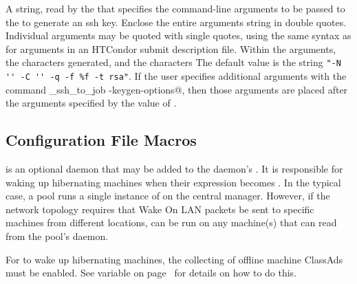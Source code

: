 \begin{description}
\label{param:SSHToJobSSHKeygenArgs}
\item[\Macro{SSH\_TO\_JOB\_SSH\_KEYGEN\_ARGS}]
  A string, read by the  that specifies 
  the command-line arguments to be passed to the 
  to generate an ssh key.
  Enclose the entire arguments string in double quotes.
  Individual arguments may be quoted with single quotes, using the same
  syntax as for arguments in an HTCondor submit description file.
  Within the arguments, 
  the characters \verb@%f@ are replaced by the path to the key file to be
  generated,
  and the characters \verb@%%@ are replaced by a single percent character.
  The default value is the string
  \verb|"-N '' -C '' -q -f %f -t rsa"|.
  If the user specifies additional
  arguments with the command
  \verb@condor_ssh_to_job -keygen-options@,
  then those arguments are placed after the arguments specified by
  the value of .

\end{description}

\subsection{\label{sec:Config-rooster} Configuration File Macros}

 is an optional daemon that may be added to the
 daemon's .
It is responsible for waking up
hibernating machines when their  expression becomes
.
In the typical case, a pool runs a single instance of
 on the central manager.
However, if the network topology requires that 
Wake On LAN packets be sent to specific machines from different locations,
 can be run on any
machine(s) that can read from the pool's  daemon.

For  to wake up hibernating machines, the collecting
of offline machine ClassAds must be enabled.  See variable
 on page~\pageref{param:CollectorPersistentAdLog}
for details on how to do this.

